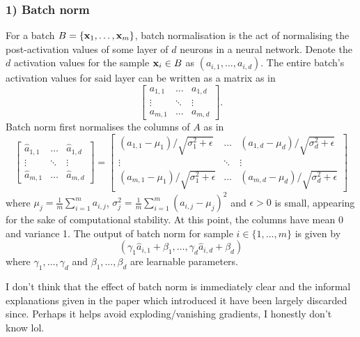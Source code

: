 \documentclass[11pt]{article}
\begin{document}
\subsubsection*{1) Batch norm}
For a batch $B=\{\mathbf{x}_1,\dots,\mathbf{x}_m\}$, batch normalisation is the act of normalising the post-activation values of some layer of $d$ neurons in a neural network. Denote the $d$ activation values for the sample $\mathbf{x}_i\in B$ as $(a_{i,1},\dots,a_{i,d})$. The entire batch's activation values for said layer can be written as a matrix as in
$$
\begin{bmatrix}
    a_{1,1} & \dots  & a_{1,d}\\
    \vdots  & \ddots & \vdots \\
    a_{m,1} & \dots  & a_{m,d}
\end{bmatrix}.
$$
Batch norm first normalises the columns of $A$ as in
$$
\begin{bmatrix}
    \hat{a}_{1,1} & \dots  & \hat{a}_{1,d}\\
    \vdots        & \ddots & \vdots       \\
    \hat{a}_{m,1} & \dots  & \hat{a}_{m,d}
\end{bmatrix}
=
\begin{bmatrix}
    (a_{1,1}-\mu_1) / \sqrt{\sigma_1^2+\epsilon} & \dots & (a_{1,d}-\mu_d) / \sqrt{\sigma_d^2+\epsilon}\\
    \vdots & \ddots & \vdots \\
    (a_{m,1}-\mu_1) / \sqrt{\sigma_1^2+\epsilon} & \dots & (a_{m,d}-\mu_d) / \sqrt{\sigma_d^2+\epsilon}
\end{bmatrix}
$$
where $\mu_j=\frac{1}{m}\sum_{i=1}^ma_{i,j}$, $\sigma_j^2=\frac{1}{m}\sum_{i=1}^m(a_{i,j}-\mu_j)^2$ and $\epsilon>0$ is small, appearing for the sake of computational stability. At this point, the columns have mean 0 and variance 1. The output of batch norm for sample $i\in\{1,\dots,m\}$ is given by
$$
(\gamma_1\hat{a}_{i,1}+\beta_1,\dots,\gamma_d\hat{a}_{i,d}+\beta_d)
$$
where $\gamma_1,\dots,\gamma_d$ and $\beta_1,\dots,\beta_d$ are learnable parameters.

I don't think that the effect of batch norm is immediately clear and the informal explanations given in the paper which introduced it have been largely discarded since. Perhaps it helps avoid exploding/vanishing gradients, I honestly don't know lol.
\end{document}
